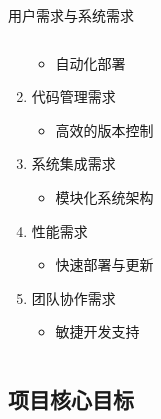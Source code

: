 \documentclass{beamer}
\begin{document}
\begin{frame}[fragile]{用户需求与系统需求}
\begin{columns}
\begin{column}{0.3\textwidth}
\begin{enumerate}
\begin{itemize}
\item \footnotesize 自动化部署
\end{itemize}
\item \footnotesize 代码管理需求
\begin{itemize}
\item \footnotesize 高效的版本控制
\end{itemize}
\item \footnotesize 系统集成需求
\begin{itemize}
\item \footnotesize 模块化系统架构
\end{itemize}
\item \footnotesize 性能需求
\begin{itemize}
\item \footnotesize 快速部署与更新
\end{itemize}
\item \footnotesize 团队协作需求
\begin{itemize}
\item \footnotesize 敏捷开发支持
\end{itemize}
\end{enumerate}
\end{column}
\end{columns}
\end{frame}


\subsection{项目核心目标}
\end{document}
